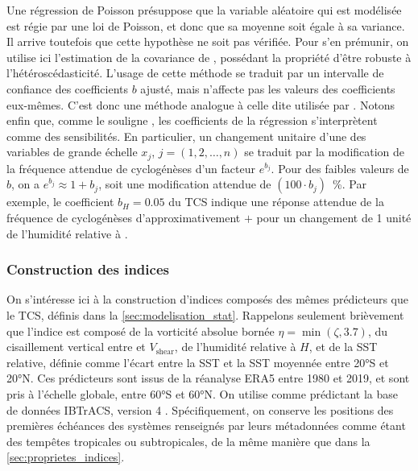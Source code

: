 \documentclass[../main.tex]{subfiles}
\begin{document}
Une régression de Poisson présuppose que la variable aléatoire qui est modélisée est régie par une loi de Poisson, et donc que sa moyenne soit égale à sa
variance. Il arrive toutefois que cette hypothèse ne soit pas vérifiée. Pour s'en prémunir, on utilise ici l'estimation de la covariance de
\textcite{mackinnon_heteroskedasticityconsistent_1985}, possédant la propriété d'être robuste à l'hétéroscédasticité. L'usage de cette méthode se traduit par un
intervalle de confiance des coefficients $b$ ajusté, mais n'affecte pas les valeurs des coefficients eux-mêmes. C'est donc une méthode analogue à celle dite
 utilisée par \textcite{tippett_poisson_2011}. Notons enfin que, comme le souligne \textcite{tippett_poisson_2011}, les coefficients de
la régression s'interprètent comme des sensibilités. En particulier, un changement unitaire d'une des variables de grande échelle $x_j$, $j = (1, 2, \ldots, n)$
se traduit par la modification de la fréquence attendue de cyclogénèses d'un facteur $e^{b_j}$. Pour des faibles valeurs de $b$, on a $e^{b_j} \approx 1 + b_j$,
soit une modification attendue de $(100 \cdot b_j)$~\%. Par exemple, le coefficient $b_H = \num{0.05}$ du TCS indique une réponse attendue de la fréquence de
cyclogénèses d'approximativement $+$ pour un changement de 1 unité de l'humidité relative à .

\subsubsection*{Construction des indices}\label{sec:construction_indices}

On s'intéresse ici à la construction d'indices composés des mêmes prédicteurs que le TCS, définis dans la \cref{sec:modelisation_stat}. Rappelons seulement
brièvement que l'indice est composé de la vorticité absolue bornée $\eta = \min(\zeta, \num{3.7})$, du cisaillement vertical entre  et 
$V_{\mathrm{shear}}$, de l'humidité relative à  $H$, et de la SST relative, définie comme l'écart entre la SST et la SST moyennée entre \ang{20}S et
\ang{20}N. Ces prédicteurs sont issus de la réanalyse ERA5 entre \num{1980} et \num{2019}, et sont pris à l'échelle globale, entre \ang{60}S et \ang{60}N. On
utilise comme prédictant la base de données IBTrACS, version 4 \parencite{knapp_international_2010}. Spécifiquement, on conserve les positions des premières
échéances des systèmes renseignés par leurs métadonnées comme étant des tempêtes tropicales ou subtropicales, de la même manière que dans la
\cref{sec:proprietes_indices}.
\end{document}
